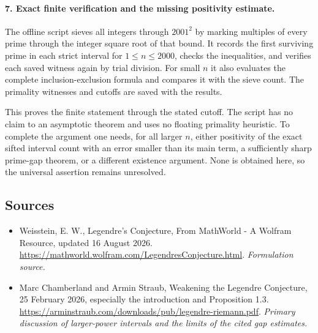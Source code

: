 \documentclass[11pt]{article}
\begin{document}
\paragraph{7. Exact finite verification and the missing positivity estimate.}
The offline script sieves all integers through $2001^2$ by marking multiples of every prime through the integer square root of that bound. It records the first surviving prime in each strict interval for $1\le n\le2000$, checks the inequalities, and verifies each saved witness again by trial division. For small $n$ it also evaluates the complete inclusion-exclusion formula and compares it with the sieve count. The primality witnesses and cutoffs are saved with the results.

This proves the finite statement through the stated cutoff. The script has no claim to an asymptotic theorem and uses no floating primality heuristic. To complete the argument one needs, for all larger $n$, either positivity of the exact sifted interval count with an error smaller than its main term, a sufficiently sharp prime-gap theorem, or a different existence argument. None is obtained here, so the universal assertion remains unresolved.

\subsection{Sources}
\begin{itemize}
\item[S1]Weisstein, E. W., Legendre's Conjecture, From MathWorld - A Wolfram Resource, updated 16 August 2026.
\url{https://mathworld.wolfram.com/LegendresConjecture.html}.
\textit{Formulation source.}
\item[E1]Marc Chamberland and Armin Straub, Weakening the Legendre Conjecture, 25 February 2026, especially the introduction and Proposition 1.3.
\url{https://arminstraub.com/downloads/pub/legendre-riemann.pdf}.
\textit{Primary discussion of larger-power intervals and the limits of the cited gap estimates.}
\end{itemize}
\end{document}

